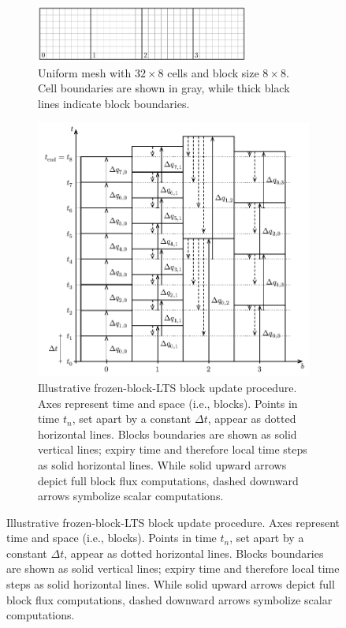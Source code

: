 \begin{figure} [htbp]
  \centering

  \begin{subfigure}{0.8\textwidth}
    \centering
    \includegraphics[width=0.7682\textwidth]{../typst/lts-scheme/lts_scheme-mesh.pdf}
    \caption[\Acrlong{lts} scheme mesh]{
      Uniform mesh with $32 \times 8$ cells and block size $8 \times 8$.
      Cell boundaries are shown in gray, while thick black lines indicate block boundaries.
    }\label{fig:frozen-block-lts-mesh}
  \end{subfigure}

  \vspace{0.5cm}

  \begin{subfigure}{0.8\textwidth}
    \centering
    \hspace{-1.05cm} %
    \includegraphics[width=\textwidth]{../typst/lts-scheme/lts_scheme_overlap.pdf}
    \caption[\Acrlong{lts} scheme]{
      Illustrative \acrlong{frozen-block-LTS} block update procedure.
      Axes represent time and space (i.e., blocks).
      Points in time $t_n$, set apart by a constant $\Delta t$, appear as dotted horizontal lines.
      Blocks boundaries are shown as solid vertical lines; expiry time and therefore local time steps as solid horizontal lines.
      While solid upward arrows depict full block flux computations, dashed downward arrows symbolize scalar computations.
    }\label{fig:frozen-block-lts-scheme}


\end{subfigure}
\end{figure}
